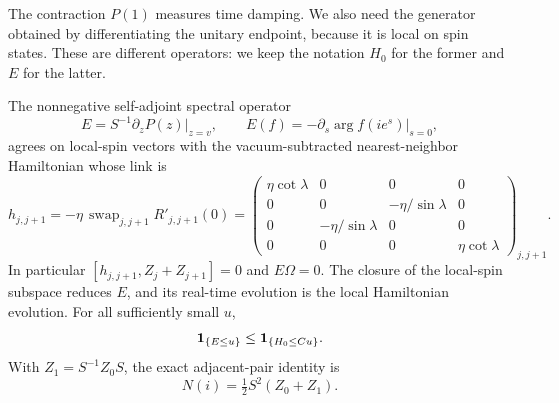 The contraction $P(1)$ measures time damping.  We also need the generator
obtained by differentiating the unitary endpoint, because it is local
on spin states.  These are different operators: we keep the notation
$H_0$ for the former and $E$ for the latter.

\begin{lemma}\label{lem:endpoint-Hamiltonian}
The nonnegative self-adjoint spectral operator
\begin{equation}\label{eq:angular-endpoint-energy}
 E=S^{-1}\partial_zP(z)\big|_{z=v},\qquad
 E(f)=-\left.\partial_s\arg f(ie^s)\right|_{s=0},
\end{equation}
agrees on local-spin vectors with the vacuum-subtracted nearest-neighbor
Hamiltonian whose link is
\begin{equation}\label{eq:angular-local-link}
 h_{j,j+1}=-\eta\,\operatorname{swap}_{j,j+1}R'_{j,j+1}(0)
 =\begin{pmatrix}
 \eta\cot\lambda&0&0&0\\
 0&0&-\eta/\sin\lambda&0\\
 0&-\eta/\sin\lambda&0&0\\
 0&0&0&\eta\cot\lambda
 \end{pmatrix}_{j,j+1}.
\end{equation}
In particular $[h_{j,j+1},Z_j+Z_{j+1}]=0$ and $E\Omega=0$.
The closure of the local-spin subspace reduces $E$, and its real-time
evolution is the local Hamiltonian evolution.  For all sufficiently
small $u$,
\begin{equation}\label{eq:angular-E-H-comparison}
 \mathbf1_{\{E\le u\}}\le\mathbf1_{\{H_0\le Cu\}}.
\end{equation}
With $Z_1=S^{-1}Z_0S$, the exact adjacent-pair identity is
\begin{equation}\label{eq:angular-adjacent-current}
 N(i)=\tfrac12 S^2(Z_0+Z_1).
\end{equation}
\end{lemma}

